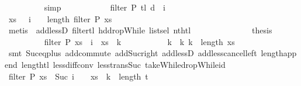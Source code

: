 \begin{isabellebody}
\ \ \ \ \ \ \ \ \isamarkupfalse%
\ simp\isanewline
\ \ \ \ \ \ \isamarkupfalse%
\ \isamarkupfalse%
\ {\isachardoublequoteopen}{\isachardot}{\isachardot}{\isachardot}\ {\isacharequal}\ filter\ P\ {\isacharparenleft}tl\ {\isacharquery}d{\isacharparenright}\ {\isacharbang}\ i{\isachardoublequoteclose}\isanewline
\ \ \ \ \ \ \ \ \isamarkupfalse%
\ {\isacharbackquoteopen}{\isacharquery}xs\ {\isasymnoteq}\ {\isacharbrackleft}{\isacharbrackright}{\isacharbackquoteclose}\ {\isacartoucheopen}i\ {\isacharplus}\ {}\ {\isacharless}\ length\ {\isacharparenleft}filter\ P\ {\isacharquery}xs{\isacharparenright}{\isacartoucheclose}\isanewline
\ \ \ \ \ \ \ \ \isamarkupfalse%
\ {\isacharparenleft}metis\ \ add{\isacharunderscore}lessD{}\ filter{\isacharunderscore}tl\ hd{\isacharunderscore}dropWhile\ list{\isachardot}sel{\isacharparenleft}{}{\isacharparenright}\ nth{\isacharunderscore}tl{\isacharparenright}\isanewline
\ \ \ \ \ \ \isamarkupfalse%
\isanewline
\ \ \ \ \ \ \isamarkupfalse%
\ {\isacharquery}thesis\isanewline
\ \ \ \ \ \ \ \ \isamarkupfalse%
\ {\isacharbackquoteopen}filter\ P\ {\isacharquery}xs\ {\isacharbang}\ i\ {\isacharequal}\ {\isacharquery}xs\ {\isacharbang}\ k{}{\isacharbackquoteclose}\ {\isacharasterisk}\isanewline
\ \ \ \ \ \ \ \ \isamarkupfalse%
\ {\isacartoucheopen}k{}\ {\isacharless}\ k{}{\isacartoucheclose}\ {\isacartoucheopen}k{}\ {\isacharless}\ length\ {\isacharquery}xs{\isacartoucheclose}\ \isanewline
\ \ \ \ \ \ \ \ \isamarkupfalse%
\ {\isacharparenleft}smt\ Suc{\isacharunderscore}eq{\isacharunderscore}plus{}\ add{\isachardot}commute\ add{\isacharunderscore}Suc{\isacharunderscore}right\ add{\isacharunderscore}lessD{}\ add{\isacharunderscore}less{\isacharunderscore}cancel{\isacharunderscore}left\ length{\isacharunderscore}append\ length{\isacharunderscore}tl\ less{\isacharunderscore}diff{\isacharunderscore}conv\ less{\isacharunderscore}trans{\isacharunderscore}Suc\ takeWhile{\isacharunderscore}dropWhile{\isacharunderscore}id{\isacharparenright}\isanewline
\ \ \ \ \isamarkupfalse%
\isanewline
\ \ \isamarkupfalse%
\isanewline
\ \ \ \ \isamarkupfalse%
\ {\isachardoublequoteopen}filter\ P\ xs\ {\isacharbang}\ {\isacharparenleft}Suc\ i\ {\isacharplus}\ {}{\isacharparenright}\ {\isacharequal}\ xs\ {\isacharbang}\ {\isacharparenleft}k{}\ {\isacharplus}\ length\ {\isacharquery}t\ {\isacharplus}\ {}{\isacharparenright}{\isachardoublequoteclose}\isanewline

\end{isabellebody}
